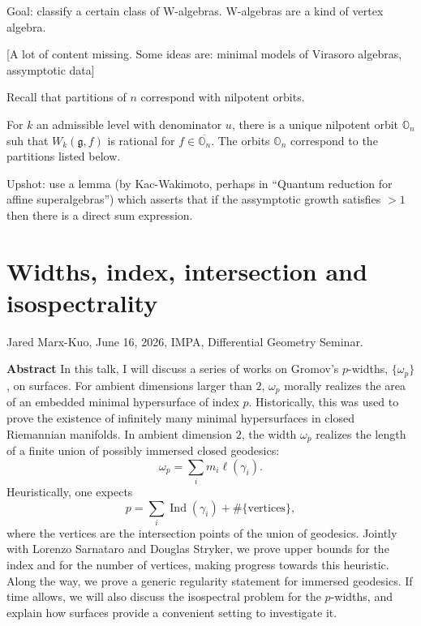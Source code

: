 \medskip\noindent
Goal: classify a certain class of W-algebras.
W-algebras are a kind of vertex algebra.

[A lot of content missing.
Some ideas are: minimal models
of Virasoro algebras,
assymptotic data]

\medskip\noindent
Recall that partitions of $n$
correspond with nilpotent orbits.

\begin{theorem}[Arakawa, 2015]
\label{theorem-arakawa}
For $k$ an admissible level with
denominator $u$, there is a unique
nilpotent orbit $\mathbb{O}_n$
suh that $W_k(\mathfrak{g},f)$
is rational for $f \in \overline{
\mathbb{O}_n}$. The orbits $\mathbb{O}_n$
correspond to the partitions listed below.
\end{theorem}

\medskip\noindent
Upshot: use a lemma 
(by Kac-Wakimoto, perhaps in
``Quantum reduction
for affine superalgebras'') which asserts
that if the assymptotic growth
satisfies $>1$ then there is a direct
sum expression.

\section{Widths, index, intersection
and isospectrality}
\label{section-widths-index-intersection}

\noindent
Jared Marx-Kuo, June 16, 2026,
IMPA, Differential Geometry Seminar.

\medskip\noindent
{\bf Abstract}
In this talk, I will discuss a series of
works on Gromov's $p$-widths,
$\{\omega_p\}$, on surfaces.
For ambient dimensions larger than $2$,
$\omega_p$ morally realizes the area of
an embedded minimal hypersurface of
index $p$. Historically, this was used
to prove the existence of infinitely
many minimal hypersurfaces in closed
Riemannian manifolds.
In ambient dimension $2$, the width
$\omega_p$ realizes the length of a
finite union of possibly immersed
closed geodesics:
$$
\omega_p
=
\sum_i m_i \ell(\gamma_i).
$$
Heuristically, one expects
$$
p
=
\sum_i \operatorname{Ind}(\gamma_i)
+
\#\{\text{vertices}\},
$$
where the vertices are the intersection
points of the union of geodesics.
Jointly with Lorenzo Sarnataro and
Douglas Stryker, we prove upper bounds
for the index and for the number of
vertices, making progress towards this
heuristic. Along the way, we prove a
generic regularity statement for
immersed geodesics.
If time allows, we will also discuss
the isospectral problem for the
$p$-widths, and explain how surfaces
provide a convenient setting to
investigate it.



